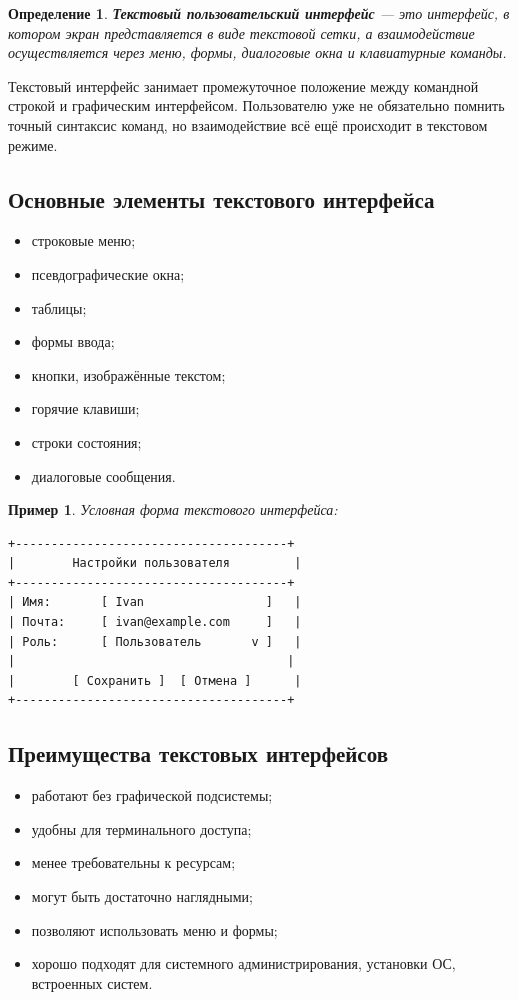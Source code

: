 \documentclass[12pt,a4paper]{article}
\newtheorem{definition}{Определение}
\newtheorem{example}{Пример}
\begin{document}
\begin{definition}
\textbf{Текстовый пользовательский интерфейс} --- это интерфейс, в котором экран представляется в виде текстовой сетки, а взаимодействие осуществляется через меню, формы, диалоговые окна и клавиатурные команды.
\end{definition}

Текстовый интерфейс занимает промежуточное положение между командной строкой и графическим интерфейсом. Пользователю уже не обязательно помнить точный синтаксис команд, но взаимодействие всё ещё происходит в текстовом режиме.

\subsection{Основные элементы текстового интерфейса}

\begin{itemize}
    \item строковые меню;
    \item псевдографические окна;
    \item таблицы;
    \item формы ввода;
    \item кнопки, изображённые текстом;
    \item горячие клавиши;
    \item строки состояния;
    \item диалоговые сообщения.
\end{itemize}

\begin{example}
Условная форма текстового интерфейса:
\begin{lstlisting}
+--------------------------------------+
|        Настройки пользователя         |
+--------------------------------------+
| Имя:       [ Ivan                 ]   |
| Почта:     [ ivan@example.com     ]   |
| Роль:      [ Пользователь       v ]   |
|                                      |
|        [ Сохранить ]  [ Отмена ]      |
+--------------------------------------+
\end{lstlisting}
\end{example}

\subsection{Преимущества текстовых интерфейсов}

\begin{itemize}
    \item работают без графической подсистемы;
    \item удобны для терминального доступа;
    \item менее требовательны к ресурсам;
    \item могут быть достаточно наглядными;
    \item позволяют использовать меню и формы;
    \item хорошо подходят для системного администрирования, установки ОС, встроенных систем.
\end{itemize}
\end{document}
